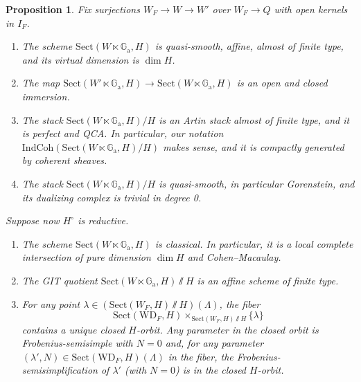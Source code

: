 \documentclass{amsart}
\newtheorem{proposition}[theorem]{Proposition}
\theoremstyle{definition}
\theoremstyle{remark}
\numberwithin{equation}{section}
\newcommand{\IndCoh}{\mathrm{IndCoh}}
\newcommand{\WD}{\mathrm{WD}}
\newcommand{\Ga}{\mathbb{G}_{\mathrm{a}}}
\newcommand{\Sect}{\mathrm{Sect}}
\begin{document}
\begin{proposition}\label{prop: properties_of_Sect}
Fix surjections $W_F \to W\to W'$ over $W_F\to Q$ with open kernels in $I_F$. 
\begin{enumerate}
    \item The scheme $\Sect (W\ltimes \Ga, H)$ is quasi-smooth, affine, almost of finite type, and its virtual dimension is $\dim H$. 
    \item The map $\Sect (W'\ltimes\Ga, H)\to \Sect (W\ltimes\Ga, H)$ is an open and closed immersion. 
    \item The stack $\Sect (W\ltimes \Ga, H)/H$ is an Artin stack almost of finite type, and it is perfect and QCA. In particular, our notation $\IndCoh(\Sect (W\ltimes \Ga, H)/H)$ makes sense, and it is compactly generated by coherent sheaves. 
    \item The stack $\Sect (W\ltimes \Ga, H)/H$ is quasi-smooth, in particular Gorenstein, and its dualizing complex is trivial in degree 0. 
\end{enumerate}
Suppose now $H^{\circ}$ is reductive. 
\begin{enumerate}
    \item[(5)] The scheme $\Sect (W\ltimes \Ga, H)$ is classical. In particular, it is a local complete intersection of pure dimension $\dim H$ and Cohen--Macaulay. 
    \item[(6)] The GIT quotient $\Sect (W\ltimes \Ga, H) \sslash H$ is an affine scheme of finite type. 
    \item[(7)] For any point $\lambda \in (\Sect(W_F, H) \sslash H)(\Lambda)$, the fiber \[
    \Sect (\WD_F, H)\times_{\Sect(W_F, H) \sslash H}\{\lambda\}\] contains a unique closed $H$-orbit. Any parameter in the closed orbit is Frobenius-semisimple with $N=0$ and, for any parameter $(\lambda', N)\in \Sect (\WD_F, H)(\Lambda)$ in the fiber, the Frobenius-semisimplification of $\lambda'$ (with $N=0$) is in the closed $H$-orbit. 
\end{enumerate}
\end{proposition}
\end{document}
